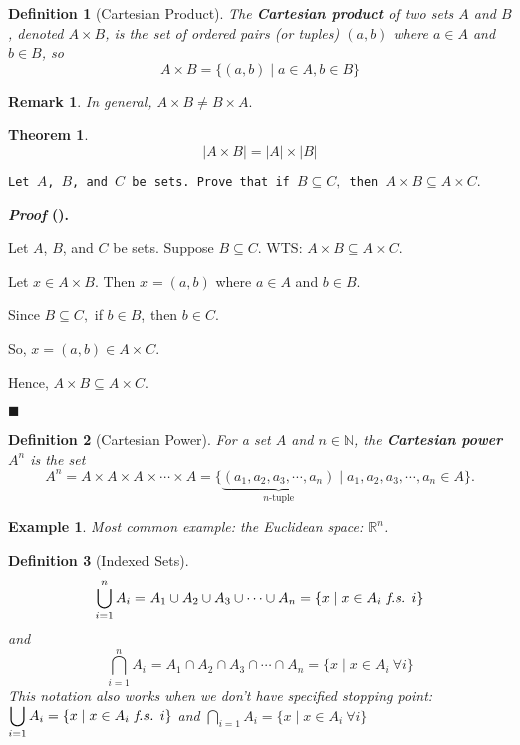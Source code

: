 \documentclass[12pt,a4paper]{article}
\newcounter{nprf}[subsection]
\newtheorem{thm}{Theorem}[subsection]
\newtheorem{df}{Definition}[subsection]
\newtheorem{eg}{Example}[subsection]
\newtheorem*{rmk}{\indent Remark}
\newenvironment*{prf}{\par\indent\textbf{\textit{Proof} (\stepcounter{nprf}\thenprf). }\par}{\par\hfill $\blacksquare$\par}
\def\R{{\mathbb{R}}}
\def\N{{\mathbb{N}}}
\def\fs{\emph{ f.s. }}
\begin{document}
\begin{df}[Cartesian Product]
	The \textbf{Cartesian product} of two sets $A$ and $B$, denoted $A\times B$, is the set of ordered pairs (or tuples) $(a,b)$ where $a\in A$ and $b\in B$, so \[A\times B=\{(a,b)\mid a\in A, b\in B\}\]
\end{df}
\begin{rmk} In general, $A\times B\neq B\times A.$\end{rmk}
\begin{thm}
	\[|A\times B|=|A|\times|B|\]	
\end{thm}
\begin{framed}
\noindent\texttt{Let $A$, $B$, and $C$ be sets. Prove that if $B\subseteq C,$ then $A\times B\subseteq A\times C.$}
\begin{prf}
	Let $A$, $B$, and $C$ be sets. Suppose $B\subseteq C$. WTS: $A\times B\subseteq A\times C.$\par Let $x\in A\times B$. Then $x=(a,b)$ where $a\in A$ and $b\in B.$\par Since $B\subseteq C,$ if $b\in B$, then $b\in C.$\par So, $x=(a,b)\in A\times C.$\par Hence, $A\times B\subseteq A\times C.$	
\end{prf}
\end{framed}
\begin{df}[Cartesian Power]
	For a set $A$ and $n\in\N$, the \textbf{Cartesian power} $A^n$ is the set \[A^n=A\times A\times A\times\cdots\times A=\{\underbrace{(a_1,a_2,a_3,\cdots,a_n)}_{n\text{-tuple}}\mid a_1,a_2,a_3,\cdots,a_n\in A\}.\]	
\end{df}
\begin{eg}
	Most common example: the Euclidean space: $\R^n$.	
\end{eg}
\begin{df}[Indexed Sets]
	\[\bigcup_{i=1}^nA_i=A_1\cup A_2\cup A_3\cup\cdots\cup A_n=\{x\mid x\in A_i \fs i\}\] and \[\bigcap_{i=1}^nA_i=A_1\cap A_2\cap A_3\cap\cdots\cap A_n=\{x\mid x\in A_i\ \forall i\}\] This notation also works when we don't have specified stopping point: $\displaystyle\bigcup_{i=1}A_i=\{x\mid x\in A_i\fs i\}$ and $\displaystyle \bigcap_{i=1}A_i=\{x\mid x\in A_i\ \forall i\}$
\end{df}
\end{document}
